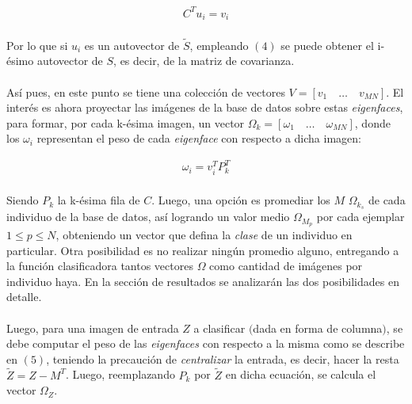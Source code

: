 \documentclass[12pt, twocolumn]{article}
\begin{document}
	\begin{align}
		C^{T}u_{i} = v_{i}
	\end{align}
	
	\paragraph{} Por lo que si $u_{i}$ es un autovector de $\widetilde{S}$, empleando $(4)$ se puede obtener el i-ésimo autovector de $S$, es decir, de la matriz de covarianza. 
	
	\paragraph{} Así pues, en este punto se tiene una colección de vectores $V = \left[v_{1}\quad\dots\quad v_{MN}\right]$. El interés es ahora proyectar las imágenes de la base de datos sobre estas \textit{eigenfaces}, para formar, por cada k-ésima imagen, un vector $\Omega_{k} = \left[\omega_{1}\quad\dots\quad\omega_{MN}\right]$, donde los $\omega_{i}$ representan el peso de cada \textit{eigenface} con respecto a dicha imagen:
	
	\begin{align}
		\omega_{i} = v_{i}^{T}P_{k}^{T}
	\end{align}
	
	\paragraph{} Siendo $P_{k}$ la k-ésima fila de $C$. Luego, una opción es promediar los $M$ $\Omega_{k_{s}}$ de cada individuo de la base de datos, así logrando un valor medio $\Omega_{M_{p}}$ por cada ejemplar $1 \le p \le N$, obteniendo un vector que defina la \textit{clase} de un individuo en particular. Otra posibilidad es no realizar ningún promedio alguno, entregando a la función clasificadora tantos vectores $\Omega$ como cantidad de imágenes por individuo haya. En la sección de resultados se analizarán las dos posibilidades en detalle.  
	
	\paragraph{} Luego, para una imagen de entrada $Z$ a clasificar $($dada en forma de columna$)$, se debe computar el peso de las \textit{eigenfaces} con respecto a la misma como se describe en $(5)$, teniendo la precaución de \textit{centralizar} la entrada, es decir, hacer la resta $\widetilde{Z} = Z - M^{T}$. Luego, reemplazando $P_{k}$ por $\widetilde{Z}$ en dicha ecuación, se calcula el vector $\Omega_{Z}$.
	
\end{document}
